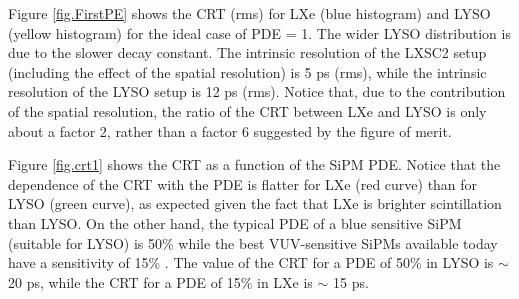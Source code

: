 \documentclass[review]{elsarticle}
\begin{document}
 Figure \ref{fig.FirstPE} shows the CRT (rms) for LXe (blue histogram) and LYSO (yellow histogram) for the ideal case of PDE = 1. The wider LYSO distribution is due to the slower decay constant. The intrinsic resolution of the LXSC2 setup (including the effect of the spatial resolution) is 5 ps (rms), while the
 intrinsic resolution of the LYSO setup is 12 ps (rms). Notice that, due to the contribution of the spatial resolution, the ratio of the CRT between LXe and LYSO is only about a factor 2, rather than a factor 6 suggested by the figure of merit. 
 
 Figure \ref{fig.crt1} shows the CRT as a function of the
 SiPM PDE. Notice that the dependence of the CRT with the PDE is flatter for LXe (red curve) than for LYSO (green curve), as expected given the fact that LXe is brighter scintillation than LYSO. On the other hand, the typical PDE of a blue sensitive SiPM (suitable for LYSO) is 50\% while the best VUV-sensitive SiPMs available today have a sensitivity of 15\% \cite{meg}. The value of the CRT for a PDE of 50\% in LYSO is $\sim$ 20 ps, while
the CRT for a PDE of 15\% in LXe is $\sim$ 15 ps.
  
\end{document}
